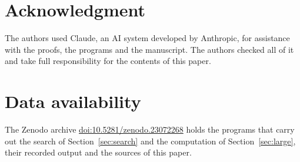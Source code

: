 \documentclass[11pt,reqno]{amsart}
\numberwithin{equation}{section}
\theoremstyle{plain}
\theoremstyle{definition}
\theoremstyle{remark}
\newcommand{\zenododoi}{10.5281/zenodo.23072268}
\begin{document}
\section*{Acknowledgment}
The authors used Claude, an AI system developed by Anthropic, for
assistance with the proofs, the programs and the manuscript. The
authors checked all of it and take full responsibility for the
contents of this paper.

\section*{Data availability}
The Zenodo archive \href{https://doi.org/\zenododoi}{doi:\zenododoi}
holds the programs that carry out the search of
Section~\ref{sec:search} and the computation of
Section~\ref{sec:large}, their recorded output and the sources of
this paper.
\end{document}
